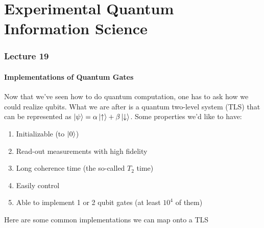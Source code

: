 \part{Experimental Quantum Information Science}

\section{Lecture 19}

\subsection{Implementations of Quantum Gates}
Now that we've seen how to do quantum computation, one has to ask how we could realize qubits.
What we are after is a quantum two-level system (TLS) that can be represented as $\ket{\psi} = \alpha \ket{\uparrow} + \beta \ket{\downarrow}$.
Some properties we'd like to have:
\begin{enumerate}
    \item Initializable (to $\ket{0}$)
    \item Read-out measurements with high fidelity
    \item Long coherence time (the so-called $T_2$ time)
    \item Easily control
    \item Able to implement 1 or 2 qubit gates (at least $10^4$ of them)
\end{enumerate}
Here are some common implementations we can map onto a TLS
